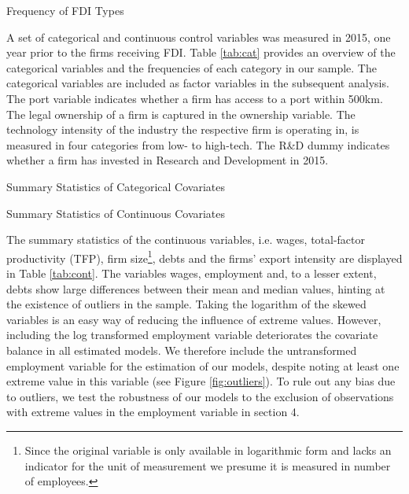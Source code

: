 \documentclass[a4paper,11pt]{scrartcl}
\begin{document}
\begin{table}[h!]
	\centering
	\caption{Frequency of FDI Types} 
	
\label{tab:freq}
\end{table}

A set of categorical and continuous control variables was measured in 2015, one year prior to the firms receiving FDI. Table \ref{tab:cat} provides an overview of the categorical variables and the frequencies of each category in our sample. %
The categorical variables are included as factor variables in the subsequent analysis. %
The port variable indicates whether a firm has access to a port within 500km. The legal ownership of a firm is captured in the ownership variable. The technology intensity of the industry the respective firm is operating in, is measured in four categories from low- to high-tech. The R\&D dummy indicates whether a firm has invested in Research and Development in 2015. \\

\begin{table}[h!]
	\centering
	\caption{Summary Statistics of Categorical Covariates} 
	
	\label{tab:cat}	
\end{table}

\begin{table}[h!]
	\centering
	\caption{Summary Statistics of Continuous Covariates} 
	
	\label{tab:cont}
\end{table}
\newpage

The summary statistics of the continuous variables, i.e. wages,  total-factor productivity (TFP), firm size\footnote{Since the original variable is only available in logarithmic form and lacks an indicator for the unit of measurement we presume it is measured in number of employees.}, debts and the firms' export intensity are displayed in Table \ref{tab:cont}. The variables wages, employment and, to a lesser extent, debts show large differences between their mean and median values, hinting at the existence of outliers in the sample. Taking the logarithm of the skewed variables is an easy way of reducing the influence of extreme values. However, including the log transformed employment variable deteriorates the covariate balance in all estimated models. We therefore include the untransformed employment variable for the estimation of our models, despite noting at least one extreme value in this variable (see Figure \ref{fig:outliers}). To rule out any bias due to outliers, we test the robustness of our models to the exclusion of observations with extreme values in the employment variable in section 4.
\end{document}
